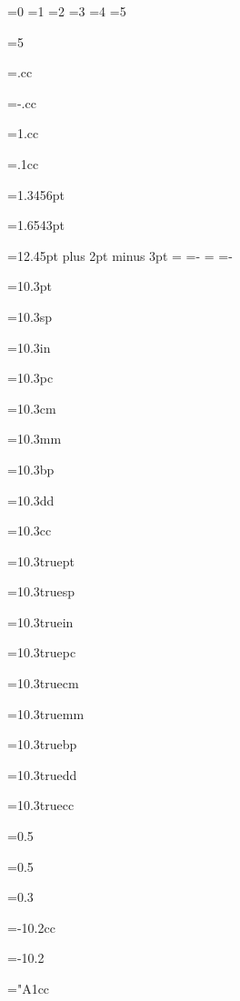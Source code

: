 =0
=1
=2
=3
=4
=5

=5
\showthe{}

=.cc
\showthe{}

=-.cc
\showthe{}

=1.cc
\showthe{}

=.1cc
\showthe{}

=1.3456pt
\showthe{}

=1.6543pt
\showthe{}

=12.45pt plus 2pt minus 3pt
\showthe{}
=
\showthe{}
=-
\showthe{}
=
\showthe{}
=-
\showthe{}

=10.3pt
\showthe{}

=10.3sp
\showthe{}

=10.3in
\showthe{}

=10.3pc
\showthe{}

=10.3cm
\showthe{}

=10.3mm
\showthe{}

=10.3bp
\showthe{}

=10.3dd
\showthe{}

=10.3cc
\showthe{}


=10.3truept
\showthe{}

=10.3truesp
\showthe{}

=10.3truein
\showthe{}

=10.3truepc
\showthe{}

=10.3truecm
\showthe{}

=10.3truemm
\showthe{}

=10.3truebp
\showthe{}

=10.3truedd
\showthe{}

=10.3truecc
\showthe{}

=0.5
\showthe{}

=0.5
\showthe{}

=0.3
\showthe{}

=-10.2cc
\showthe{}

=-10.2
\showthe{}

="A1cc
\showthe{}

